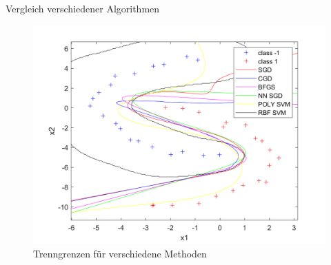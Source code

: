 \documentclass[ngerman]{beamer}
\begin{document}
\begin{frame}{Vergleich verschiedener Algorithmen}
            \begin{figure}
                \includegraphics[width=\textwidth,height=0.7\textheight,keepaspectratio]{../code/octave/images/compbatchdecisionboundary}
                \caption{Trenngrenzen für verschiedene Methoden}
                \label{fig:vergleichalgos}
            \end{figure}
\end{frame}
\end{document}
